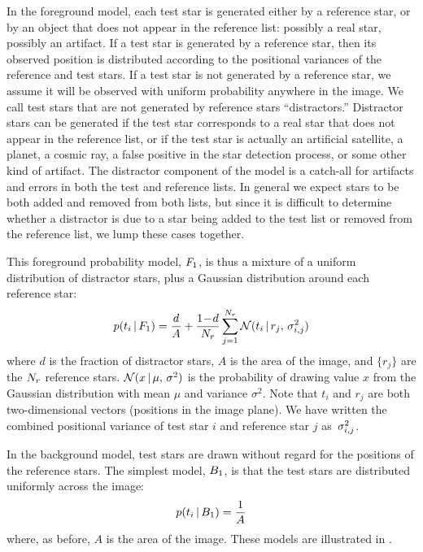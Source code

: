 In the foreground model, each test star is generated either by a
reference star, or by an object that does not appear in the reference
list: possibly a real star, possibly an artifact.  If a test star is
generated by a reference star, then its observed position is
distributed according to the positional variances of the reference and
test stars.  If a test star is not generated by a reference star, we
assume it will be observed with uniform probability anywhere in the
image.  We call test stars that are not generated by reference stars
``distractors.''  Distractor stars can be generated if the test star
corresponds to a real star that does not appear in the reference list,
or if the test star is actually an artificial satellite, a planet, a
cosmic ray, a false positive in the star detection process, or some
other kind of artifact.  The distractor component of the model is a
catch-all for artifacts and errors in both the test and reference
lists.  In general we expect stars to be both added and removed from
both lists, but since it is difficult to determine whether a
distractor is due to a star being added to the test list or removed
from the reference list, we lump these cases together.


This foreground probability model, $F_1$, is thus a mixture of a
uniform distribution of distractor stars, plus a Gaussian distribution
around each reference star:
\begin{equation}
  p(t_i \,\vert\, F_1) = \frac{d}{A} + \frac{1\!-\!d}{{N_r}} \sum_{j=1}^{{N_r}} \mathcal{N}(t_i \, | \, r_j,\, \sigma^2_{i,j})
  \label{eq:pf1}
\end{equation}
where $d$ is the fraction of distractor stars, $A$ is the area of the
image, and $\{r_j\}$ are the ${N_r}$ reference stars.
$\mathcal{N}(x \, | \, \mu,\, \sigma^2)$ is the probability of drawing value $x$
from the Gaussian distribution with mean $\mu$ and variance
$\sigma^2$.  Note that $t_i$ and $r_j$ are both two-dimensional
vectors (positions in the image plane).  We have written the combined
positional variance of test star $i$ and reference star $j$ \mbox{as
$\sigma^2_{i,j}$.}



In the background model, test stars are drawn without regard for the
positions of the reference stars.  The simplest model, $B_1$, is
that the test stars are distributed uniformly across the image:
\begin{equation}
  p(t_i \,\vert\, B_1) = \frac{1}{A}
  \label{eq:pb1}
\end{equation}
where, as before, $A$ is the area of the image.  These models are
illustrated in .


